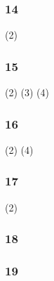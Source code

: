 \subsubsection*{14}  (2)  

\subsubsection*{15}  (2)  (3)  (4) 

\subsubsection*{16}  (2) 
(4) 
\subsubsection*{17}  (2)

\subsubsection*{18} 

\subsubsection*{19} 
